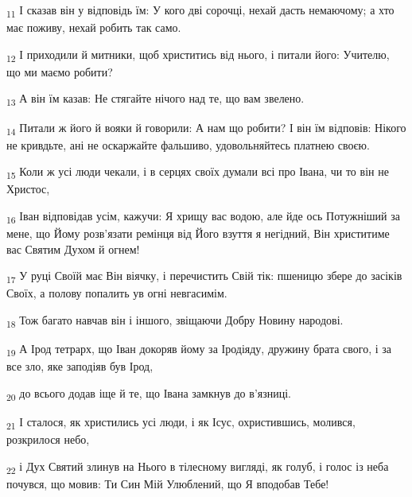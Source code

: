 \begin{tcolorbox}
\textsubscript{11} І сказав він у відповідь їм: У кого дві сорочці, нехай дасть немаючому; а хто має поживу, нехай робить так само.
\end{tcolorbox}
\begin{tcolorbox}
\textsubscript{12} І приходили й митники, щоб христитись від нього, і питали його: Учителю, що ми маємо робити?
\end{tcolorbox}
\begin{tcolorbox}
\textsubscript{13} А він їм казав: Не стягайте нічого над те, що вам звелено.
\end{tcolorbox}
\begin{tcolorbox}
\textsubscript{14} Питали ж його й вояки й говорили: А нам що робити? І він їм відповів: Нікого не кривдьте, ані не оскаржайте фальшиво, удовольняйтесь платнею своєю.
\end{tcolorbox}
\begin{tcolorbox}
\textsubscript{15} Коли ж усі люди чекали, і в серцях своїх думали всі про Івана, чи то він не Христос,
\end{tcolorbox}
\begin{tcolorbox}
\textsubscript{16} Іван відповідав усім, кажучи: Я хрищу вас водою, але йде ось Потужніший за мене, що Йому розв'язати ремінця від Його взуття я негідний, Він христитиме вас Святим Духом й огнем!
\end{tcolorbox}
\begin{tcolorbox}
\textsubscript{17} У руці Своїй має Він віячку, і перечистить Свій тік: пшеницю збере до засіків Своїх, а полову попалить ув огні невгасимім.
\end{tcolorbox}
\begin{tcolorbox}
\textsubscript{18} Тож багато навчав він і іншого, звіщаючи Добру Новину народові.
\end{tcolorbox}
\begin{tcolorbox}
\textsubscript{19} А Ірод тетрарх, що Іван докоряв йому за Іродіяду, дружину брата свого, і за все зло, яке заподіяв був Ірод,
\end{tcolorbox}
\begin{tcolorbox}
\textsubscript{20} до всього додав іще й те, що Івана замкнув до в'язниці.
\end{tcolorbox}
\begin{tcolorbox}
\textsubscript{21} І сталося, як христились усі люди, і як Ісус, охристившись, молився, розкрилося небо,
\end{tcolorbox}
\begin{tcolorbox}
\textsubscript{22} і Дух Святий злинув на Нього в тілесному вигляді, як голуб, і голос із неба почувся, що мовив: Ти Син Мій Улюблений, що Я вподобав Тебе!
\end{tcolorbox}

